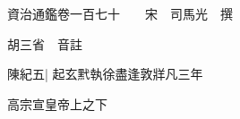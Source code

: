 






























































資治通鑑卷一百七十　　宋　司馬光　撰

胡三省　音註

陳紀五|{
	起玄黓執徐盡逢敦牂凡三年}


高宗宣皇帝上之下

